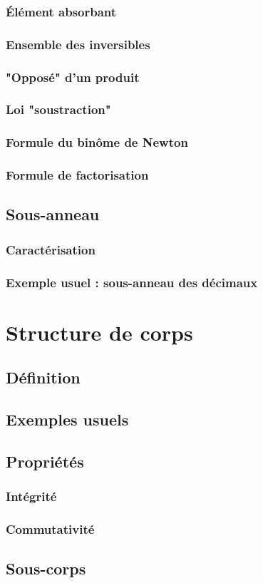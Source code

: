 \documentclass[12pt,a4paper,french]{book}
\begin{document}
\begin{spacing}{1.0}
			\subsubsection{Élément absorbant}
			\subsubsection{Ensemble des inversibles}
			\subsubsection{"Opposé" d'un produit}
			\subsubsection{Loi "soustraction"}
			\subsubsection{Formule du binôme de Newton}
			\subsubsection{Formule de factorisation}
		\subsection{Sous-anneau}
			\subsubsection{Caractérisation}
			\subsubsection{Exemple usuel : sous-anneau des décimaux}
	\section{Structure de corps}
		\subsection{Définition}
		\subsection{Exemples usuels}
		\subsection{Propriétés}
			\subsubsection{Intégrité}
			\subsubsection{Commutativité}
		\subsection{Sous-corps}
	\end{spacing}
	
\end{document}
